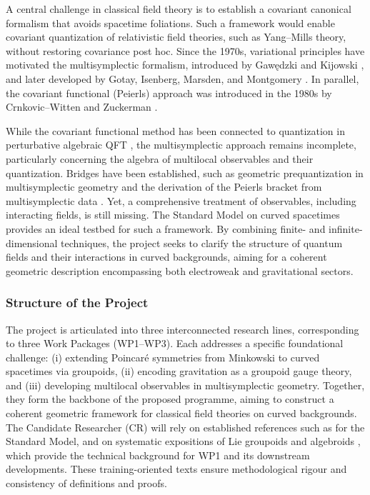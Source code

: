 \documentclass[11pt]{msca-pf}
\begin{document}
A central challenge in classical field theory is to establish a covariant canonical formalism that avoids spacetime foliations. Such a framework would enable covariant quantization of relativistic field theories, such as Yang--Mills theory, without restoring covariance post hoc. Since the 1970s, variational principles have motivated the multisymplectic formalism, introduced by Gaw\k{e}dzki \cite{Gawedzki-1972} and Kijowski \cite{Kijowski-1973}, and later developed by Gotay, Isenberg, Marsden, and Montgomery \cite{Gotay-1991, Gimmsy1}. In parallel, the covariant functional (Peierls) approach was introduced in the 1980s by Crnkovic--Witten \cite{Crnkovic-Witten:1987} and Zuckerman \cite{Zuckerman:1987}.

While the covariant functional method has been connected to quantization in perturbative algebraic QFT \cite{Brunetti-Fredenhagen-Verch-2003, Rejzner-2016}, the multisymplectic approach remains incomplete, particularly concerning the algebra of multilocal observables and their quantization. Bridges have been established, such as geometric prequantization in multisymplectic geometry \cite{Helein:2011, Sevestre2021} and the derivation of the Peierls bracket from multisymplectic data \cite{Forger2005, Gieres:2021}. Yet, a comprehensive treatment of observables, including interacting fields, is still missing. The Standard Model on curved spacetimes provides an ideal testbed for such a framework. By combining finite- and infinite-dimensional techniques, the project seeks to clarify the structure of quantum fields and their interactions in curved backgrounds, aiming for a coherent geometric description encompassing both electroweak and gravitational sectors.

\subsubsection*{Structure of the Project}

The project is articulated into three interconnected research lines, corresponding to three Work Packages (WP1–WP3). Each addresses a specific foundational challenge: (i) extending Poincaré symmetries from Minkowski to curved spacetimes via groupoids, (ii) encoding gravitation as a groupoid gauge theory, and (iii) developing multilocal observables in multisymplectic geometry. Together, they form the backbone of the proposed programme, aiming to construct a coherent geometric framework for classical field theories on curved backgrounds. The Candidate Researcher (CR) will rely on established references such as \cite{Hamilton2017,Bleeker2005} for the Standard Model, and on systematic expositions of Lie groupoids and algebroids \cite{Mackenzie2005,MoerdijkMrcun2003,MeinrenkenNotes,Weinstein1996,OlverSGWQ}, which provide the technical background for WP1 and its downstream developments. These training-oriented texts ensure methodological rigour and consistency of definitions and proofs.
\end{document}
